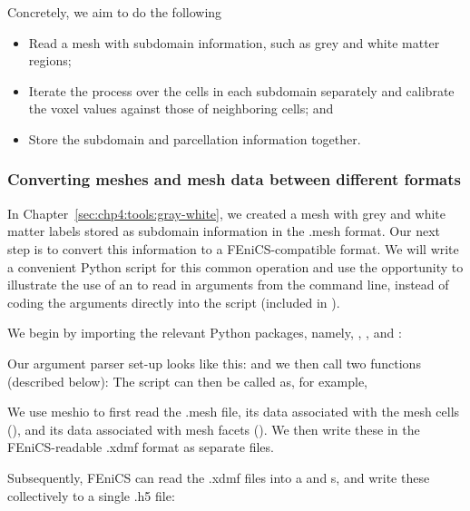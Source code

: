 Concretely, we aim to do the following
\begin{itemize}
\item
  Read a mesh with subdomain information, such as grey and white matter
  regions;
\item
  Iterate the process over the cells in each subdomain separately and calibrate
  the voxel values against those of neighboring cells; and
\item
  Store the subdomain and parcellation information together.
\end{itemize}

\subsubsection*{Converting meshes and mesh data between different formats} 
\label{chp4:meshio-converting}

In Chapter~\ref{sec:chp4:tools:gray-white}, we created a mesh with
grey and white matter labels stored as subdomain information in the
.mesh format. Our next step is to convert this information to a
FEniCS-compatible format. We will write a convenient Python script for this
common operation and use the opportunity to illustrate the use of an
 to read in arguments from the command
line, instead of coding the arguments directly into the script
(included in ).

We begin by importing the relevant Python packages, namely, ,
, and :

\noindent Our argument parser set-up looks like this:
\noindent and we then  call two functions (described below): 
The script can then be called as, for example, 

We use meshio to first read the .mesh file, its data associated with
the mesh cells (), and its data associated with mesh
facets (). We then write these in the FEniCS-readable
.xdmf format as separate files.

Subsequently, FEniCS can read the .xdmf files into a
 and s, and write these
collectively to a single .h5 file:

